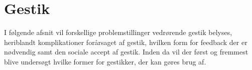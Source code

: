 \section{Gestik}
\label{Gestik}
%
I følgende afsnit vil forskellige problemstillinger vedrørende gestik belyses, heriblandt komplikationer forårsaget af gestik, hvilken form for feedback der er nødvendig samt den sociale accept af gestik. Inden da vil der først og fremmest blive undersøgt hvilke former for gestikker, der kan gøres brug af.  
%
